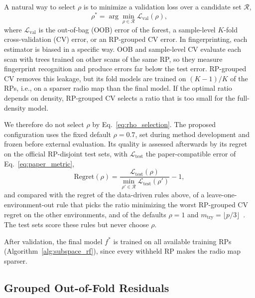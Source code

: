 A natural way to select $\rho$ is to minimize a validation loss over a candidate set $\mathcal{R}$,
\begin{equation}
	\rho^{*}
	=
	\arg\min_{\rho\in\mathcal{R}}
	\mathcal{L}_{\mathrm{val}}(\rho),
	\label{eq:rho_selection}
\end{equation}
where $\mathcal{L}_{\mathrm{val}}$ is the out-of-bag (OOB) error of the forest, a sample-level $K$-fold cross-validation (CV) error, or an RP-grouped CV error. In fingerprinting, each estimator is biased in a specific way. OOB and sample-level CV evaluate each scan with trees trained on other scans of the same RP, so they measure fingerprint recognition and produce errors far below the test error. RP-grouped CV removes this leakage, but its fold models are trained on $(K-1)/K$ of the RPs, i.e., on a sparser radio map than the final model. If the optimal ratio depends on density, RP-grouped CV selects a ratio that is too small for the full-density model.

We therefore do not select $\rho$ by Eq.~\eqref{eq:rho_selection}. The proposed configuration uses the fixed default $\rho=0.7$, set during method development and frozen before external evaluation. Its quality is assessed afterwards by its regret on the official RP-disjoint test sets, with $\mathcal{L}_{\mathrm{test}}$ the paper-compatible error of Eq.~\eqref{eq:paper_metric},
\begin{equation}
	\mathrm{Regret}(\rho)
	=
	\frac{\mathcal{L}_{\mathrm{test}}(\rho)}{\min_{\rho'\in\mathcal{R}}\mathcal{L}_{\mathrm{test}}(\rho')}-1,
	\label{eq:regret}
\end{equation}
and compared with the regret of the data-driven rules above, of a leave-one-environment-out rule that picks the ratio minimizing the worst RP-grouped CV regret on the other environments, and of the defaults $\rho=1$ and $m_{\mathrm{try}}=\lfloor p/3\rfloor$~\cite{breiman2001random}. The test sets score these rules but never choose $\rho$.

After validation, the final model $f^{*}$ is trained on all available training RPs (Algorithm~\ref{alg:subspace_rf}), since every withheld RP makes the radio map sparser.



\subsection{Grouped Out-of-Fold Residuals}
\label{subsec:oof_residual}

